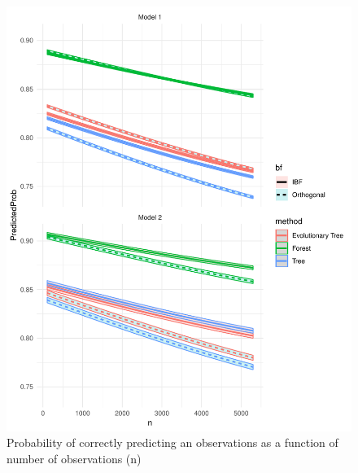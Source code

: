 \documentclass[]{elsarticle} %
\makeatletter
\def\maxwidth{\ifdim\Gin@nat@width>\linewidth\linewidth
\else\Gin@nat@width\fi}
\let\Oldincludegraphics\includegraphics
\renewcommand{\includegraphics}[1]{\Oldincludegraphics[width=\maxwidth]{#1}}
\makeatother
\begin{document}
\begin{figure}
\centering
\includegraphics{Trees_with_Base_Functions_v3_files/figure-latex/fig12-estimated-accuracy-n-1.pdf}
\caption{\label{fig:fig12-estimated-accuracy-n}Probability of correctly
predicting an observations as a function of number of observations (n)}
\end{figure}
\end{document}
